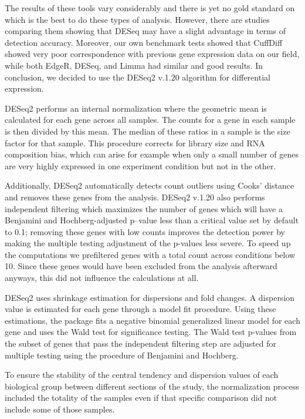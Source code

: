 The results of these tools vary considerably and there is yet no gold standard on which is the best to do these types of analysis. However, there are studies comparing them showing that DESeq may have a slight advantage in terms of detection accuracy. Moreover, our own benchmark tests showed that CuffDiff showed very poor correspondence with previous gene expression data on our field, while both EdgeR, DESeq, and Limma had similar and good results. In conclusion, we decided to use the DESeq2 v.1.20 algorithm for differential expression.\cite{Love2014}

DESeq2 performs an internal normalization where the geometric mean is calculated for each gene across all samples. The counts for a gene in each sample is then divided by this mean. The median of these ratios in a sample is the size factor for that sample. This procedure corrects for library size and RNA composition bias, which can arise for example when only a small number of genes are very highly expressed in one experiment condition but not in the other.

Additionally, DESeq2 automatically detects count outliers using Cooks' distance and removes these genes from the analysis. DESeq2 v.1.20 also performs independent filtering which maximizes the number of genes which will have a Benjamini and Hochberg-adjusted p–value\cite{Benjamini1995} less than a critical value set by default to 0.1; removing these genes with low counts improves the detection power by making the multiple testing adjustment of the p-values less severe. To speed up the computations we prefiltered genes with a total count across conditions below 10. Since these genes would have been excluded from the analysis afterward anyways, this did not influence the calculations at all.

DESeq2 uses shrinkage estimation for dispersions and fold changes. A dispersion value is estimated for each gene through a model fit procedure. Using these estimations, the package fits a negative binomial generalized linear model for each gene and uses the Wald test for significance testing. The Wald test p-values from the subset of genes that pass the independent filtering step are adjusted for multiple testing using the procedure of Benjamini and Hochberg.\cite{Benjamini1995}

To ensure the stability of the central tendency and dispersion values of each biological group between different sections of the study, the normalization process included the totality of the samples even if that specific comparison did not include some of those samples.

